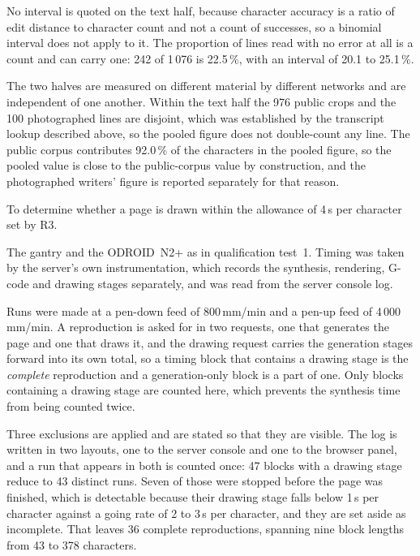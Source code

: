         No interval is quoted on the text half, because character accuracy is a
        ratio of edit distance to character count and not a count of successes,
        so a binomial interval does not apply to it. The proportion of lines
        read with no error at all is a count and can carry one: 242 of 1\,076 is
        22.5\,\%, with an interval of 20.1 to 25.1\,\%.

        The two halves are measured on different material by different networks
        and are independent of one another. Within the text half the 976 public
        crops and the 100 photographed lines are disjoint, which was established
        by the transcript lookup described above, so the pooled figure does not
        double-count any line. The public corpus contributes 92.0\,\% of the
        characters in the pooled figure, so the pooled value is close to the
        public-corpus value by construction, and the photographed writers'
        figure is reported separately for that reason.

\medskip

        \medskip

        To determine whether a page is drawn within the allowance of 4\,s per
        character set by R3.

        \medskip

        The gantry and the ODROID~N2+ as in qualification test~1. Timing was
        taken by the server's own instrumentation, which records the synthesis,
        rendering, G-code and drawing stages separately, and was read from the
        server console log.

        \medskip

        Runs were made at a pen-down feed of 800\,mm/min and a pen-up feed of
        4\,000\,mm/min. A reproduction is asked for in two requests, one that
        generates the page and one that draws it, and the drawing request
        carries the generation stages forward into its own total, so a timing
        block that contains a drawing stage is the \emph{complete} reproduction
        and a generation-only block is a part of one. Only blocks containing a
        drawing stage are counted here, which prevents the synthesis time from
        being counted twice.

        Three exclusions are applied and are stated so that they are visible.
        The log is written in two layouts, one to the server console and one to
        the browser panel, and a run that appears in both is counted once: 47
        blocks with a drawing stage reduce to 43 distinct runs. Seven of those
        were stopped before the page was finished, which is detectable because
        their drawing stage falls below 1\,s per character against a going rate
        of 2 to 3\,s per character, and they are set aside as incomplete. That
        leaves 36 complete reproductions, spanning nine block lengths from 43 to
        378 characters.

